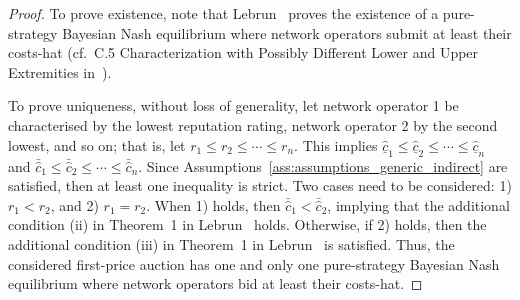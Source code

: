 \begin{proof}
To prove existence, note that Lebrun~\cite{Lebrun2006} proves the existence of a pure-strategy Bayesian Nash equilibrium where network operators submit at least their costs-hat (cf.~C.5 Characterization with Possibly Different Lower and Upper Extremities in~\cite{Lebrun2006}).

To prove uniqueness, without loss of generality, let network operator 1 be characterised by the lowest reputation rating, network operator 2 by the second lowest, and so on; that is, let $r_1 \leq r_2 \leq\cdots \leq r_n$. This implies $\underline{\hat{c}}_1 \leq \underline{\hat{c}}_2 \leq\cdots \leq \underline{\hat{c}}_n$ and $\bar{\hat{c}}_1 \leq \bar{\hat{c}}_2 \leq \cdots\leq \bar{\hat{c}}_n$. Since Assumptions~\ref{ass:assumptions_generic_indirect} are satisfied, then at least one inequality is strict. Two cases need to be considered: 1) $r_1 < r_2$, and 2) $r_1 = r_2$. When 1) holds, then $\bar{\hat{c}}_1 < \bar{\hat{c}}_2$, implying that the additional condition (ii) in Theorem~1 in Lebrun~\cite{Lebrun2006} holds. Otherwise, if 2) holds, then the additional condition (iii) in Theorem~1 in Lebrun~\cite{Lebrun2006} is satisfied. Thus, the considered first-price auction has one and only one pure-strategy Bayesian Nash equilibrium where network operators bid at least their costs-hat.
\end{proof}

